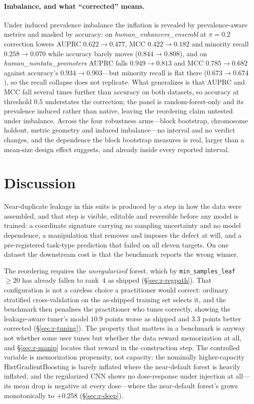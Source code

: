 \documentclass[webpdf,modern,large,namedate]{oup-authoring-template}%
\begin{document}
\paragraph{Imbalance, and what ``corrected'' means.} Under induced prevalence imbalance the inflation is revealed by prevalence-aware metrics and masked by accuracy: on \textit{human\_enhancers\_ensembl} at $\pi=0.2$ correction lowers AUPRC $0.622\to0.477$, MCC $0.422\to0.182$ and minority recall $0.258\to0.070$ while accuracy barely moves ($0.844\to0.808$), and on \textit{human\_nontata\_promoters} AUPRC falls $0.949\to0.813$ and MCC $0.785\to0.682$ against accuracy's $0.934\to0.903$---but minority recall is flat there ($0.673\to0.674$), so the recall collapse does not replicate. What generalizes is that AUPRC and MCC fall several times further than accuracy on both datasets, so accuracy at threshold $0.5$ understates the correction; the panel is random-forest-only and its prevalence induced rather than native, leaving the reordering claim untested under imbalance. Across the four robustness arms---block bootstrap, chromosome holdout, metric geometry and induced imbalance---no interval and no verdict changes, and the dependence the block bootstrap measures is real, larger than a mean-size design effect suggests, and already inside every reported interval.

\section{Discussion}\label{sec:discussion}

Near-duplicate leakage in this suite is produced by a step in how the data were assembled, and that step is visible, editable and reversible before any model is trained: a coordinate signature carrying no sampling uncertainty and no model dependence, a manipulation that removes and imposes the defect at will, and a pre-registered task-type prediction that failed on all eleven targets. On one dataset the downstream cost is that the benchmark reports the wrong winner.

The reordering requires the \emph{unregularized} forest, which by \texttt{min\_samples\_leaf}$\ge20$ has already fallen to rank~4 as shipped (\S\ref{sec:r-regpath}). That configuration is not a careless choice a practitioner would correct: ordinary stratified cross-validation on the as-shipped training set selects it, and the benchmark then penalises the practitioner who tunes correctly, showing the leakage-aware tuner's model $10.9$ points worse as shipped and $3.3$ points better corrected (\S\ref{sec:r-tuning}). The property that matters in a benchmark is anyway not whether some user tunes but whether the data reward memorization at all, and \S\ref{sec:r-manip} locates that reward in the construction step. The controlled variable is memorization propensity, not capacity: the nominally higher-capacity HistGradientBoosting is barely inflated where the near-default forest is heavily inflated, and the regularized CNN shows no dose-response under injection at all---its mean drop is negative at every dose---where the near-default forest's grows monotonically to $+0.258$ (\S\ref{sec:r-deep}).
\end{document}
